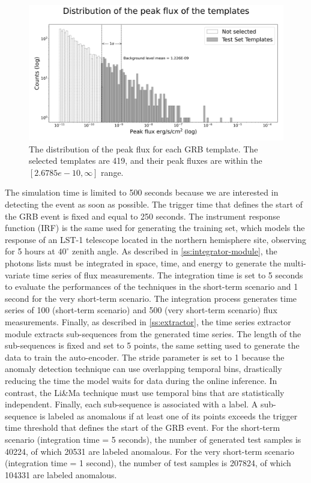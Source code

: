 \begin{figure}[!htb]
\centering
\includegraphics[width=1\textwidth]{figures/experiments/templates_max_flux_distributions.png}
\captionsetup{width=0.9\linewidth}
\caption{The distribution of the peak flux for each GRB template. The selected templates are 419, and their peak fluxes are within the $[2.6785e-10, \infty]$ range.}
\label{f:exp-max-flux-distribution-E}
\end{figure}
The simulation time is limited to 500 seconds because we are interested in detecting the event as soon as possible. The trigger time that defines the start of the GRB event is fixed and equal to 250 seconds. The instrument response function (IRF) is the same used for generating the training set, which models the response of an LST-1 telescope located in the northern hemisphere site, observing for 5 hours at $40^{\circ}$ zenith angle.
As described in \autoref{ss:integrator-module}, the photons lists must be integrated in space, time, and energy to generate the multi-variate time series of flux measurements. The integration time is set to 5 seconds to evaluate the performances of the techniques in the short-term scenario and 1 second for the very short-term scenario. The integration process generates time series of 100 (short-term scenario) and 500 (very short-term scenario) flux measurements. Finally, as described in \autoref{ss:extractor}, the time series extractor module extracts sub-sequences from the generated time series. The length of the sub-sequences is fixed and set to 5 points, the same setting used to generate the data to train the auto-encoder. The stride parameter is set to 1 because the anomaly detection technique can use overlapping temporal bins, drastically reducing the time the model waits for data during the online inference. In contrast, the Li\&Ma technique must use temporal bins that are statistically independent. Finally, each sub-sequence is associated with a label. A sub-sequence is labeled as anomalous if at least one of its points exceeds the trigger time threshold that defines the start of the GRB event. For the short-term scenario (integration time = 5 seconds), the number of generated test samples is 40224, of which 20531 are labeled anomalous. For the very short-term scenario (integration time = 1 second), the number of test samples is 207824, of which 104331 are labeled anomalous.


